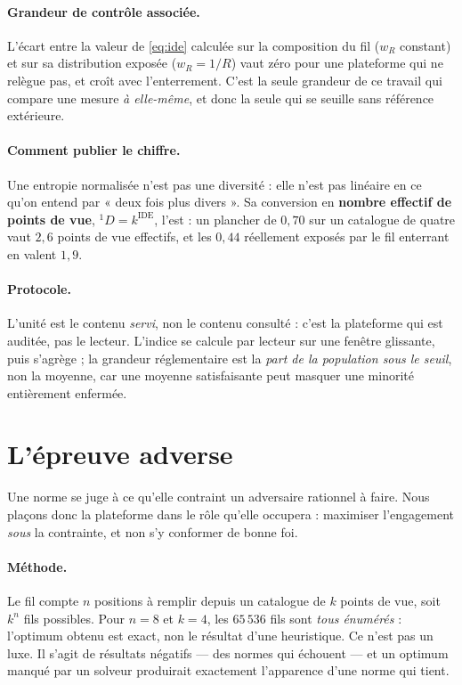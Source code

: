 \documentclass[11pt,a4paper]{article}
\begin{document}
\paragraph{Grandeur de contrôle associée.} L'écart entre la valeur de \eqref{eq:ide} calculée
sur la composition du fil ($w_R$ constant) et sur sa distribution exposée ($w_R = 1/R$)
vaut zéro pour une plateforme qui ne relègue pas, et croît avec l'enterrement. C'est la
seule grandeur de ce travail qui compare une mesure \emph{à elle-même}, et donc la seule qui
se seuille sans référence extérieure.

\paragraph{Comment publier le chiffre.} Une entropie normalisée n'est pas une diversité : elle
n'est pas linéaire en ce qu'on entend par « deux fois plus divers ». Sa conversion en
\textbf{nombre effectif de points de vue}, ${}^{1}\!D = k^{\mathrm{IDE}}$, l'est
\citep{jost2006} : un plancher de $0{,}70$ sur un catalogue de quatre vaut $2{,}6$ points de vue
effectifs, et les $0{,}44$ réellement exposés par le fil enterrant en valent $1{,}9$.

\paragraph{Protocole.} L'unité est le contenu \emph{servi}, non le contenu consulté : c'est
la plateforme qui est auditée, pas le lecteur. L'indice se calcule par lecteur sur une
fenêtre glissante, puis s'agrège ; la grandeur réglementaire est la \emph{part de la
population sous le seuil}, non la moyenne, car une moyenne satisfaisante peut masquer une
minorité entièrement enfermée.

\section{L'épreuve adverse}
\label{sec:adverse}

Une norme se juge à ce qu'elle contraint un adversaire rationnel à faire. Nous plaçons donc
la plateforme dans le rôle qu'elle occupera : maximiser l'engagement \emph{sous} la
contrainte, et non s'y conformer de bonne foi.

\paragraph{Méthode.} Le fil compte $n$ positions à remplir depuis un catalogue de $k$ points
de vue, soit $k^n$ fils possibles. Pour $n = 8$ et $k = 4$, les $65\,536$ fils sont
\emph{tous énumérés} : l'optimum obtenu est exact, non le résultat d'une heuristique. Ce
n'est pas un luxe. Il s'agit de résultats négatifs --- des normes qui échouent --- et un
optimum manqué par un solveur produirait exactement l'apparence d'une norme qui tient.
\end{document}

